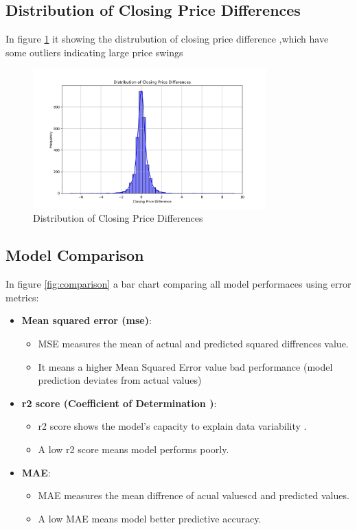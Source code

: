 \subsection{Distribution of Closing Price Differences}
In figure \ref{fig:dist} it showing the distrubution of closing price difference ,which have some outliers indicating large price swings

\begin{figure}[h]
    \centering
    \includegraphics[width=0.8\textwidth]{./figures_amit/distribution_closing_price_diff.png}
    \caption{Distribution of Closing Price Differences}
    \label{fig:dist}
\end{figure}

\subsection{Model Comparison}
In figure \ref{fig:comparison} a bar chart comparing all model performaces using error metrics:
\begin{itemize}
    \item \textbf{Mean squared error (mse)}:
        \begin{itemize}
        \item MSE measures the mean of actual and predicted squared diffrences value.
        \item It means a higher Mean Squared Error value  bad performance (model prediction deviates from actual values)
        \end{itemize}
    \item \textbf{r2 score (Coefficient of Determination )}:
    \begin{itemize}
    
        \item r2 score shows the model's capacity to explain data variability .
        \item A low r2 score means model performs poorly. 
    \end{itemize}
    \item \textbf{MAE}:
        \begin{itemize}

        \item MAE measures the mean diffrence of acual valuescd and predicted values.
        \item A low MAE means model better predictive accuracy. 
        \end{itemize}
\end{itemize}

